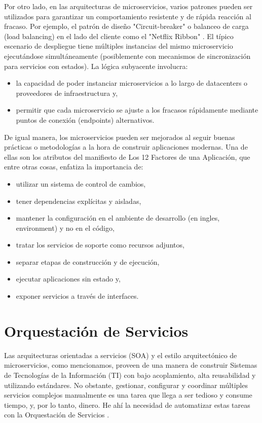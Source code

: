         Por otro lado, en las arquitecturas de microservicios, varios patrones pueden ser utilizados para garantizar un comportamiento resistente y de rápida reacción al fracaso. Por ejemplo, el patrón de diseño "Circuit-breaker" \cite{Nygard2007-ed} o balanceo de carga (load balancing) en el lado del cliente como el "Netflix Ribbon" \cite{Netflix2016-ri}. El típico escenario de despliegue tiene múltiples instancias del mismo microservicio ejecutándose simultáneamente (posiblemente con mecanismos de sincronización para servicios con estados). La lógica subyacente involucra: 
        \begin{itemize}
        \item la capacidad de poder instanciar microservicios a lo largo de datacenters o proveedores de infraestructura y, 
        \item permitir que cada microservicio se ajuste a los fracasos rápidamente mediante puntos de conexión (endpoints) alternativos.

        \end{itemize}        
        De igual manera, los microservicios pueden ser mejorados al seguir buenas prácticas o metodologías a la hora de construir aplicaciones modernas. Una de ellas son los atributos del manifiesto de Los 12 Factores de una Aplicación, que entre otras cosas, enfatiza la importancia de:
        \begin{itemize}
        \item utilizar un sistema de control de cambios, 
        \item tener dependencias explícitas y aisladas, 
        \item mantener la configuración en el ambiente de desarrollo (en ingles, environment) y no en el código, 
        \item tratar los servicios de soporte como recursos adjuntos, 
        \item separar etapas de construcción y de ejecución, 
        \item ejecutar aplicaciones sin estado y, 
        \item exponer servicios a través de interfaces.
        \end{itemize}
        
    \section{Orquestación de Servicios}
        Las arquitecturas orientadas a servicios (SOA) y el estilo arquitectónico de microservicios, como mencionamos, proveen de una manera de construir Sistemas de Tecnologías de la Información (TI) con bajo acoplamiento, alta reusabilidad y utilizando estándares. No obstante, gestionar, configurar y coordinar múltiples servicios complejos manualmente es una tarea que llega a ser tedioso y consume tiempo, y, por lo tanto, dinero. He ahí la necesidad de automatizar estas tareas con la Orquestación de Servicios \cite{Kapuruge2014-qq}.
        
